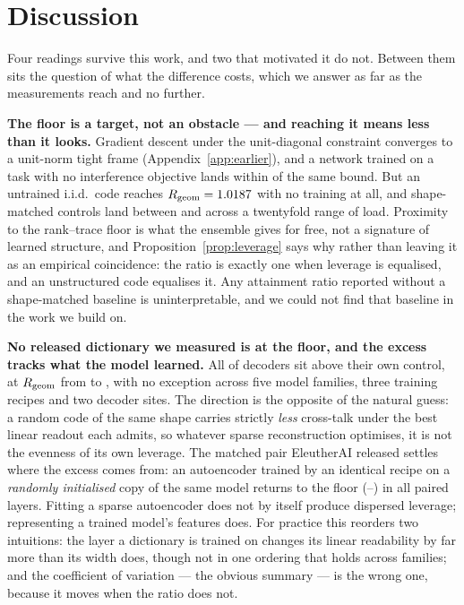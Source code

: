 \section{Discussion}
\label{sec:discussion}

Four readings survive this work, and two that motivated it do not. Between them sits the question of
what the difference costs, which we answer as far as the measurements reach and no further.

\textbf{The floor is a target, not an obstacle --- and reaching it means less than it looks.}
Gradient descent under the unit-diagonal constraint converges to a unit-norm tight frame
(Appendix~\ref{app:earlier}), and a network trained on a task with no interference objective lands
within \EfiveLfourRatioPinvMean{} of the same bound. But an untrained i.i.d.\ code reaches
$R_{\mathrm{geom}}=1.0187{}$ with no training at all, and \SaeControls{} shape-matched controls land
between \SaeCtlRgeomMin{} and \SaeCtlRgeomMax{} across a twentyfold range of load. Proximity to the
rank--trace floor is what the ensemble gives for free, not a signature of learned structure, and
Proposition~\ref{prop:leverage} says why rather than leaving it as an empirical coincidence: the ratio
is exactly one when leverage is equalised, and an unstructured code equalises it. Any attainment
ratio reported without a shape-matched baseline is uninterpretable, and we could not find that
baseline in the work we build on.

\textbf{No released dictionary we measured is at the floor, and the excess tracks what the model
learned.} All \SaeDictsAboveControl{} of \SaeDicts{} decoders sit above their own control, at $R_{\mathrm{geom}}$
from \SaeDictRgeomMin{} to \SaeDictRgeomMax{}, with no exception across five model families, three
training recipes and two decoder sites. The direction is the opposite of the natural guess: a random
code of the same shape carries strictly \emph{less} cross-talk under the best linear readout each
admits, so whatever sparse reconstruction optimises, it is not the evenness of its own leverage. The matched pair EleutherAI released settles where the excess comes from: an
autoencoder trained by an identical recipe on a \emph{randomly initialised} copy of the same model
returns to the floor (\SaeRandInitRgeomMin--\SaeRandInitRgeomMax) in all \SaePairedLayers{} paired
layers. Fitting a sparse autoencoder does not by itself produce dispersed leverage; representing a
trained model's features does. For practice this reorders two intuitions: the layer a dictionary is
trained on changes its linear readability by far more than its width does, though not in one ordering
that holds across families; and the coefficient of variation --- the obvious summary --- is the wrong
one, because it moves when the ratio does not.

